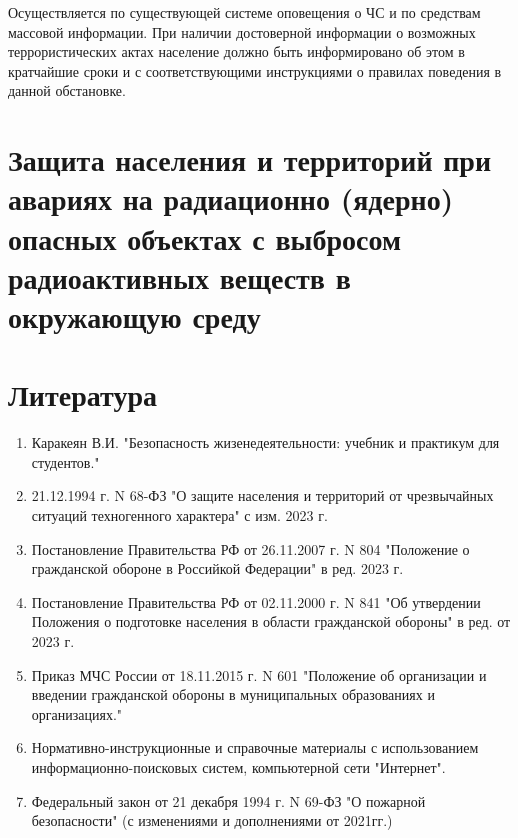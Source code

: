 \documentclass[a4paper, 12pt]{article}
\theoremstyle{definition}
\begin{document}
        Осуществляется по существующей системе оповещения о ЧС и по средствам массовой информации. При наличии достоверной информации о возможных террористических актах население должно быть информировано об этом в \\кратчайшие сроки и с соответствующими инструкциями о правилах поведения в данной обстановке.

        \section{Защита населения и территорий при авариях на радиационно (ядерно) опасных объектах с выбросом радиоактивных веществ в окружающую среду}




        \section{Литература}
        \begin{enumerate}
            \item Каракеян В.И. "Безопасность жизенедеятельности: учебник и практикум для студентов."
            \item 21.12.1994 г. N 68-ФЗ "О защите населения и территорий от чрезвычайных ситуаций техногенного характера" с изм. 2023 г.
            \item Постановление Правительства РФ от 26.11.2007 г. N 804 "Положение о гражданской обороне в Российкой Федерации" в ред. 2023 г.
            \item Постановление Правительства РФ от 02.11.2000 г. N 841 "Об утвердении Положения о подготовке населения в области гражданской обороны" в ред. от 2023 г.
            \item Приказ МЧС России от 18.11.2015 г. N 601 "Положение об организации и введении гражданской обороны в муниципальных образованиях и организациях."
            \item Нормативно-инструкционные и справочные материалы с использованием информационно-поисковых систем, компьютерной сети "Интернет".
            \item Федеральный закон от 21 декабря 1994 г. N 69-ФЗ "О пожарной безопасности" (с изменениями и дополнениями от 2021гг.)
        \end{enumerate}
\end{document}

